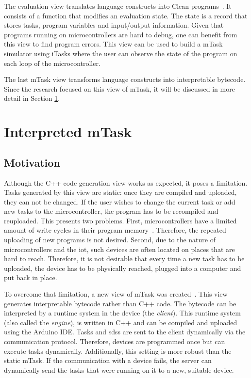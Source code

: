 The evaluation view translates language constructs into Clean programs~\cite{mtasks2}. It consists of a function that modifies an evaluation state. The state is a record that stores tasks, program variables and input/output information. Given that programs running on microcontrollers are hard to debug, one can benefit from this view to find program errors. This view can be used to build a mTask simulator using iTasks where the user can observe the state of the program on each loop of the microcontroller.

The last mTask view transforms language constructs into interpretable bytecode. Since the research focused on this view of mTask, it will be discussed in more detail in Section \ref{sec:int_mtask}.

\section{Interpreted mTask}\label{sec:int_mtask}

\subsection{Motivation}

Although the C++ code generation view works as expected, it poses a limitation. Tasks generated by this view are static: once they are compiled and uploaded, they can not be changed. If the user wishes to change the current task or add new tasks to the microcontroller, the program has to be recompiled and reuploaded. This presents two problems. First, microcontrollers have a limited amount of write cycles in their program memory~\cite{martthesis}. Therefore, the repeated uploading of new programs is not desired. Second, due to the nature of microcontrollers and the \ac{iot}, such devices are often located on places that are hard to reach. Therefore, it is not desirable that every time a new task has to be uploaded, the device has to be physically reached, plugged into a computer and put back in place.

To overcome that limitation, a new view of mTask was created~\cite{martthesis}. This view generates interpretable bytecode rather than C++ code. The bytecode can be interpreted by a runtime system in the device (the \textit{client}). This runtime system (also called the \textit{engine}), is written in C++ and can be compiled and uploaded using the Arduino IDE. Tasks and \acp{sds} are sent to the client dynamically via the communication protocol. Therefore, devices are programmed once but can execute tasks dynamically. Additionally, this setting is more robust than the static mTask. If the communication with a device fails, the server can dynamically send the tasks that were running on it to a new, suitable device. 


